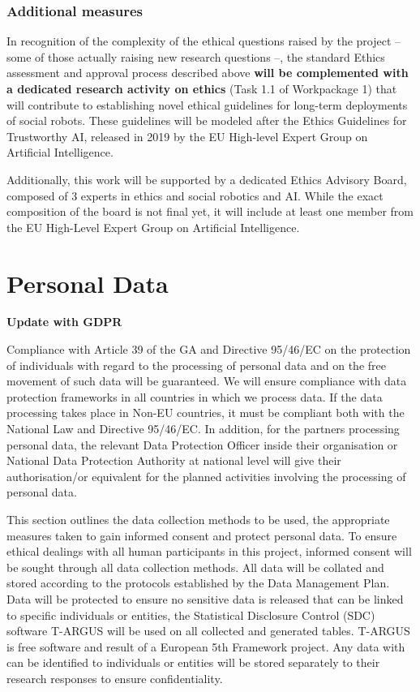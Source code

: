 \documentclass[11pt,a4paper]{report}
\newcommand{\TODO}[1]{{\color{red}\textbf{#1}}}
\begin{document}
\subsubsection{Additional measures}

In recognition of the complexity of the ethical questions raised by the project --
some of those actually raising new research questions --, the standard Ethics
assessment and approval process described above \textbf{will be complemented with a
dedicated research activity on ethics} (Task 1.1 of Workpackage 1) that will
contribute to establishing novel ethical guidelines for long-term deployments of
social robots. These guidelines will be modeled after the Ethics Guidelines for
Trustworthy AI, released in 2019 by the EU High-level Expert Group on Artificial
Intelligence.

Additionally, this work will be supported by a dedicated Ethics Advisory Board,
composed of 3 experts in ethics and social robotics and AI. While the exact
composition of the board is not final yet, it will include at least one member
from the EU High-Level Expert Group on Artificial Intelligence.


\section{Personal Data}
\TODO{Update with GDPR}

Compliance with Article 39 of the GA and Directive 95/46/EC on the protection of
individuals with regard to the processing of personal data and on the free
movement of such data will be guaranteed. We will ensure compliance with data
protection frameworks in all countries in which we process data. If the data
processing takes place in Non-EU countries, it must be compliant both with the
National Law and Directive 95/46/EC. In addition, for the partners processing
personal data, the relevant Data Protection Officer inside their organisation or
National Data Protection Authority at national level will give their
authorisation/or equivalent for the planned activities involving the processing
of personal data. 

This section outlines the data collection methods to be used, the appropriate
measures taken to gain informed consent and protect personal data. To ensure
ethical dealings with all human participants in this project, informed consent
will be sought through all data collection methods. All data will be collated
and stored according to the protocols established by the Data Management Plan.
Data will be protected to ensure no sensitive data is released that can be
linked to specific individuals or entities, the Statistical Disclosure Control
(SDC) software T-ARGUS will be used on all collected and generated tables.
T-ARGUS is free software and result of a European 5th Framework project. Any
data with can be identified to individuals or entities will be stored separately
to their research responses to ensure confidentiality.  
\end{document}
